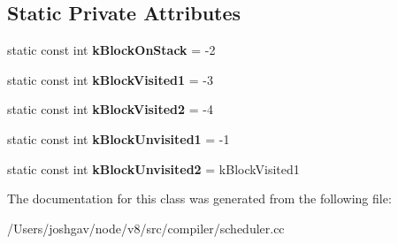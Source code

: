 \subsection*{Static Private Attributes}
\begin{DoxyCompactItemize}
\item 
static const int {\bfseries k\+Block\+On\+Stack} = -\/2\hypertarget{classv8_1_1internal_1_1compiler_1_1_special_r_p_o_numberer_a8f4444b7dc1cdae353810a3420decfd5}{}\label{classv8_1_1internal_1_1compiler_1_1_special_r_p_o_numberer_a8f4444b7dc1cdae353810a3420decfd5}

\item 
static const int {\bfseries k\+Block\+Visited1} = -\/3\hypertarget{classv8_1_1internal_1_1compiler_1_1_special_r_p_o_numberer_a6e5d9a6f84c25f4fe1ca4eadd67875c7}{}\label{classv8_1_1internal_1_1compiler_1_1_special_r_p_o_numberer_a6e5d9a6f84c25f4fe1ca4eadd67875c7}

\item 
static const int {\bfseries k\+Block\+Visited2} = -\/4\hypertarget{classv8_1_1internal_1_1compiler_1_1_special_r_p_o_numberer_a9ff1635bd6d3813096b9ce7cf4042cd6}{}\label{classv8_1_1internal_1_1compiler_1_1_special_r_p_o_numberer_a9ff1635bd6d3813096b9ce7cf4042cd6}

\item 
static const int {\bfseries k\+Block\+Unvisited1} = -\/1\hypertarget{classv8_1_1internal_1_1compiler_1_1_special_r_p_o_numberer_aa7450f648e42a83d53edba20b715cfd6}{}\label{classv8_1_1internal_1_1compiler_1_1_special_r_p_o_numberer_aa7450f648e42a83d53edba20b715cfd6}

\item 
static const int {\bfseries k\+Block\+Unvisited2} = k\+Block\+Visited1\hypertarget{classv8_1_1internal_1_1compiler_1_1_special_r_p_o_numberer_adaab8518cd9333fb4dec5867f2543832}{}\label{classv8_1_1internal_1_1compiler_1_1_special_r_p_o_numberer_adaab8518cd9333fb4dec5867f2543832}

\end{DoxyCompactItemize}


The documentation for this class was generated from the following file\+:\begin{DoxyCompactItemize}
\item 
/\+Users/joshgav/node/v8/src/compiler/scheduler.\+cc\end{DoxyCompactItemize}
